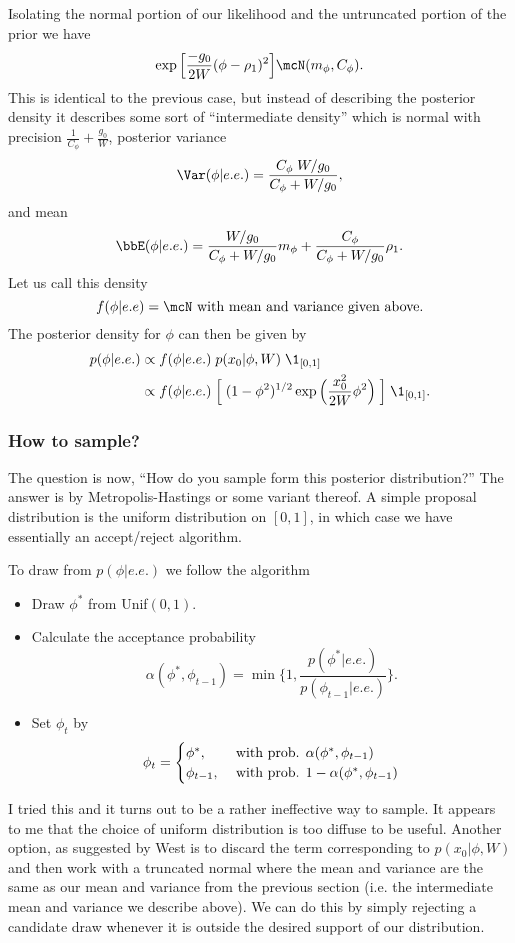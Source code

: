 \documentclass{article}
\begin{document}
Isolating the normal portion of our likelihood and the untruncated portion of the prior we have
\[
\exp \Big[ \frac{-g_0}{2W} (\phi - \rho_1)^2 \Big] \mcN(m_\phi, C_\phi).
\]
This is identical to the previous case, but instead of describing the posterior density it describes some sort of ``intermediate density'' which is normal with precision $\frac{1}{C_\phi} + \frac{g_0}{W}$, posterior variance
\[
\Var(\phi | e.e.) = \frac{C_\phi \; W/g_0}{C_\phi + W/g_0},
\]
and mean
\[
\bbE(\phi | e.e.) = \frac{W/g_0}{C_\phi + W/g_0} m_\phi + \frac{C_\phi}{C_\phi + W/g_0} \rho_1.
\]
Let us call this density
\[
f(\phi | e.e) = \mcN \textmd{ with mean and variance given above.}
\]
The posterior density for $\phi$ can then be given by
\begin{align*}
p(\phi | e.e.) 
& \propto f(\phi | e.e.) \; p(x_0 | \phi, W) \; \1_{[0,1]} \\
& \propto f(\phi | e.e.) \; \Big[ \; (1-\phi^2)^{1/2} \exp \Big( \frac{x_0^2}{2 W} \phi^2 \Big) \; \Big] \; \1_{[0,1]}.
\end{align*}

\subsubsection{How to sample?}

The question is now, ``How do you sample form this posterior distribution?''  The answer is by Metropolis-Hastings or some variant thereof.  A simple proposal distribution is the uniform distribution on $[0,1]$, in which case we have essentially an accept/reject algorithm.

To draw from $p(\phi | e.e.)$ we follow the algorithm
\begin{itemize}
\item Draw $\phi^*$ from Unif$(0,1)$.
\item Calculate the acceptance probability
\[
\alpha(\phi^*, \phi_{t-1}) = \min \Big\{ 1,  \frac{p(\phi^*|e.e.)}{p(\phi_{t-1}|e.e.)} \Big\}.
\]
\item Set $\phi_{t}$ by
\[
\phi_t = 
\begin{cases}
\phi^*, & \textmd{ with prob. } \alpha(\phi^*, \phi_{t-1}) \\
\phi_{t-1}, & \textmd{ with prob. } 1 - \alpha(\phi^*, \phi_{t-1})
\end{cases}
\]
\end{itemize}

I tried this and it turns out to be a rather ineffective way to sample.  It appears to me that the choice of uniform distribution is too diffuse to be useful.  Another option, as suggested by West is to discard the term corresponding to $p(x_0 | \phi, W)$ and then work with a truncated normal where the mean and variance are the same as our mean and variance from the previous section (i.e. the intermediate mean and variance we describe above).  We can do this by simply rejecting a candidate draw whenever it is outside the desired support of our distribution.
\end{document}
